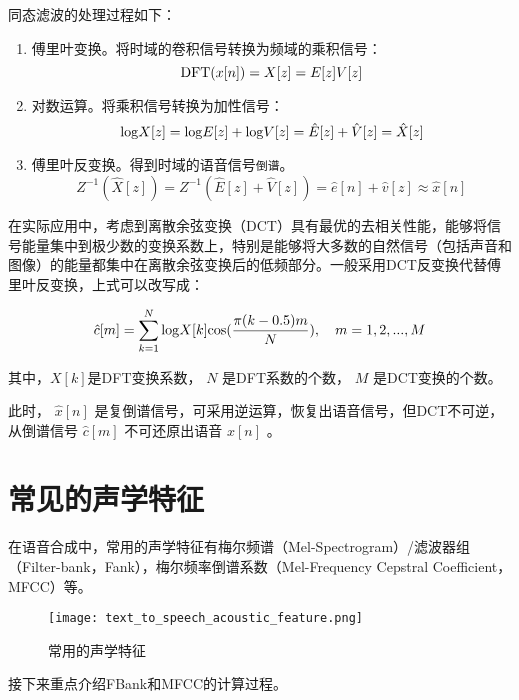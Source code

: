 \documentclass[cn,10pt,math=newtx,citestyle=gb7714-2015,bibstyle=gb7714-2015]{elegantbook}
\begin{document}
同态滤波的处理过程如下：

\begin{enumerate}
  \item 傅里叶变换。将时域的卷积信号转换为频域的乘积信号：
  \begin{equation}
    {\rm DFT}(x[n])=X[z]=E[z]V[z]
  \end{equation}
  \item 对数运算。将乘积信号转换为加性信号：
  \begin{equation}
    {\rm log} X[z]={\rm log}E[z]+{\rm log}V[z]=\hat{E}[z]+\hat{V}[z]=\hat{X}[z]
  \end{equation}
  \item 傅里叶反变换。得到时域的语音信号\lstinline{倒谱}。
  \begin{equation}
    Z^{-1}(\hat{X}[z])=Z^{-1}(\hat{E}[z]+\hat{V}[z])=\hat{e}[n]+\hat{v}[z]\approx \hat{x}[n]
  \end{equation}
\end{enumerate}

在实际应用中，考虑到离散余弦变换（DCT）具有最优的去相关性能，能够将信号能量集中到极少数的变换系数上，特别是能够将大多数的自然信号（包括声音和图像）的能量都集中在离散余弦变换后的低频部分。一般采用DCT反变换代替傅里叶反变换，上式可以改写成：

\begin{equation}
  \hat{c}[m]=\sum_{k=1}^N{\rm log}X[k]{\rm cos}(\frac{\pi (k-0.5)m}{N}),\quad m=1,2,...,M
\end{equation}

其中，$X[k]$是DFT变换系数， $N$ 是DFT系数的个数， $M$ 是DCT变换的个数。

此时， $\hat{x}[n]$ 是复倒谱信号，可采用逆运算，恢复出语音信号，但DCT不可逆，从倒谱信号 $\hat{c}[m]$ 不可还原出语音 $x[n]$ 。

\section{常见的声学特征}

在语音合成中，常用的声学特征有梅尔频谱（Mel-Spectrogram）/滤波器组（Filter-bank，Fank），梅尔频率倒谱系数（Mel-Frequency Cepstral Coefficient，MFCC）等。

\begin{figure}[htbp]
  \centering
  \texttt{[image: text\_to\_speech\_acoustic\_feature.png]}
  \caption{常用的声学特征 \label{fig:acoustic_feature}}
\end{figure}

接下来重点介绍FBank和MFCC的计算过程。
\end{document}
